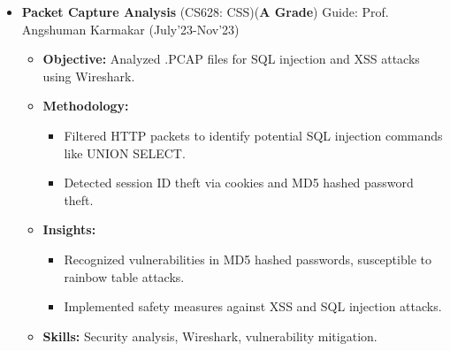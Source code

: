 \documentclass[10.8pt, a4paper]{extarticle}
\begin{document}
\begin{itemize}
  \item \textbf{Packet Capture Analysis} (CS628: CSS)(\textbf{A Grade}) Guide: Prof. Angshuman Karmakar \href{https://github.com/souvikcseiitk/CS628-Computer-Systems-Security/tree/main/Assignment%204}{\faGithub{}}  \hfill(July'23-Nov'23)
	\\[-0.6cm]
	\begin{itemize}
 
          \item \textbf{Objective:} Analyzed .PCAP files for SQL injection and XSS attacks using Wireshark.
          
          \item \textbf{Methodology:}
          \begin{itemize}
          \item Filtered HTTP packets to identify potential SQL injection commands like UNION SELECT.
          \item Detected session ID theft via cookies and MD5 hashed password theft.
          \end{itemize}
          
          \item \textbf{Insights:}
          \begin{itemize}
          \item Recognized vulnerabilities in MD5 hashed passwords, susceptible to rainbow table attacks.
          \item Implemented safety measures against XSS and SQL injection attacks.
          \end{itemize}
          
          \item \textbf{Skills:} Security analysis, Wireshark, vulnerability mitigation.
          
         
\end{itemize}
\end{itemize}
\vspace{2pt}
\end{document}
